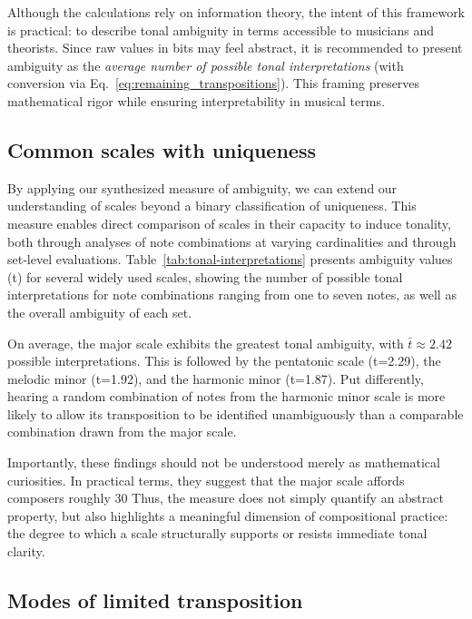 \documentclass[10pt,twocolumn]{article}
\numberwithin{equation}{section} %
\begin{document}
    Although the calculations rely on information theory, the intent of this framework is practical: to describe tonal ambiguity in terms accessible to musicians and theorists.
    Since raw values in bits may feel abstract, it is recommended to present ambiguity as the \textit{average number of possible tonal interpretations} (with conversion via Eq.~\ref{eq:remaining_transpositions}).
    This framing preserves mathematical rigor while ensuring interpretability in musical terms.

    \subsection{Common scales with uniqueness}

    By applying our synthesized measure of ambiguity, we can extend our understanding of scales beyond a binary classification of uniqueness.
    This measure enables direct comparison of scales in their capacity to induce tonality, both through analyses of note combinations at varying cardinalities and through set‑level evaluations.
    Table~\ref{tab:tonal-interpretations} presents ambiguity values (t) for several widely used scales, showing the number of possible tonal interpretations for note combinations ranging from one to seven notes, as well as the overall ambiguity of each set.

    On average, the major scale exhibits the greatest tonal ambiguity, with $\bar{t}\approx 2.42$ possible interpretations.
    This is followed by the pentatonic scale (t=2.29), the melodic minor (t=1.92), and the harmonic minor (t=1.87).
    Put differently, hearing a random combination of notes from the harmonic minor scale is more likely to allow its transposition to be identified unambiguously than a comparable combination drawn from the major scale.

    Importantly, these findings should not be understood merely as mathematical curiosities.
    In practical terms, they suggest that the major scale affords composers roughly 30%
    Thus, the measure does not simply quantify an abstract property, but also highlights a meaningful dimension of compositional practice: the degree to which a scale structurally supports or resists immediate tonal clarity.

    

    \subsection{Modes of limited transposition}
\end{document}
